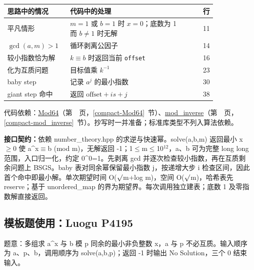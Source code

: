 \begin{center}\small
\begin{tabular}{@{}p{0.30\linewidth}p{0.55\linewidth}r@{}}
\toprule
思路中的情况 & 代码中的处理 & 行\\
\midrule
平凡情形 & $m=1$ 或 $b=1$ 时 $x=0$；底数为 1 而 $b\ne1$ 时无解 & 11\\
$\gcd(a,m)>1$ & 循环剥离公因子 & 14\\
较小指数恰为解 & $k\equiv b$ 时返回当前 \texttt{offset} & 16\\
化为互质问题 & 目标值乘 $k^{-1}$ & 23\\
baby step & 记录 $a^j$ 的最小指数 & 30\\
giant step 命中 & 返回 $\mathrm{offset}+is+j$ & 38\\
\bottomrule
\end{tabular}
\end{center}

代码依赖：\hyperref[compact-Mod64]{Mod64}（第~\pageref{compact-Mod64}~页，\ref{compact-Mod64}~节）、\hyperref[compact-mod_inverse]{mod\_\allowbreak{}inverse}（第~\pageref{compact-mod_inverse}~页，\ref{compact-mod_inverse}~节）。抄写时一并准备；标准库类型不列入算法依赖。

{\sloppy{}\noindent\textbf{接口契约：}依赖 number\_theory.hpp 的求逆与快速幂。solve(a,b,m) 返回最小 x$\ge$0 使 a\textasciicircum{}x$\equiv$b (mod m)，无解返回 -1；1$\le$m$\le$10$^{12}$，a、b 可为完整 long long 范围，入口归一化，约定 0\textasciicircum{}0=1。先剥离 gcd 并逐次检查较小指数，再在互质剩余问题上 BSGS。baby 表对同余幂保留最小指数 j，按递增大步 i 检查区间，因此首个命中即最小解。单次期望时间 O($\sqrt{\vphantom x}$m+log m)，空间 O($\sqrt{\vphantom x}$m)，哈希表先 reserve；基于 unordered\_map 的界为期望界。每次调用独立建表；底数 1 及零指数解直接返回。\par}



\Needspace{339pt}

\subsection*{模板题使用：Luogu P4195}

\label{usage-example-47}

题意：多组求 a\textasciicircum{}x 与 b 模 p 同余的最小非负整数 x，a 与 p 不必互质。输入顺序为 a、p、b，调用顺序为 solve(a,b,p)；返回 -1 时输出 No Solution，三个 0 结束输入。


